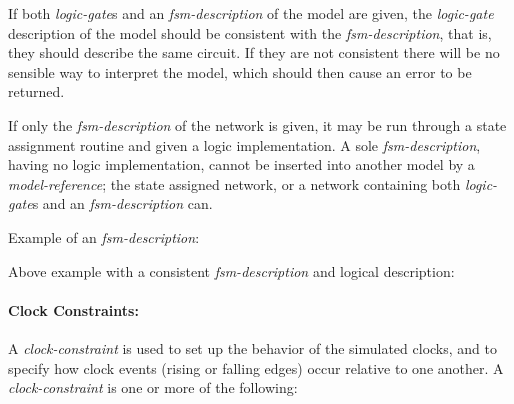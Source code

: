{\begin{pespace}
If both {\em logic-gate}s and an {\em fsm-description} of the model are
given, the {\em logic-gate} description of the model should be consistent
with the {\em fsm-description}, that is, they should describe the same
circuit.  If they are not consistent there will be no sensible way to
interpret the model, which should then cause an error to be returned.

If only the {\em fsm-description} of the network is given, it may be run
through a state assignment routine and given a logic implementation.  A sole
{\em fsm-description}, having no logic implementation, cannot be inserted
into another model by a {\em model-reference}; the state assigned network,
or a network containing both {\em logic-gate}s and an {\em fsm-description}
can.

Example of an {\em fsm-description}:
Above example with a consistent {\em fsm-description} and logical
description:

\paragraph{Clock Constraints:}

A {\em clock-constraint} is used to set up the behavior of the simulated
clocks, and to specify how clock events (rising or falling edges) occur
relative to one another.  A {\em clock-constraint} is one or more of the
following:


\end{pespace}}
